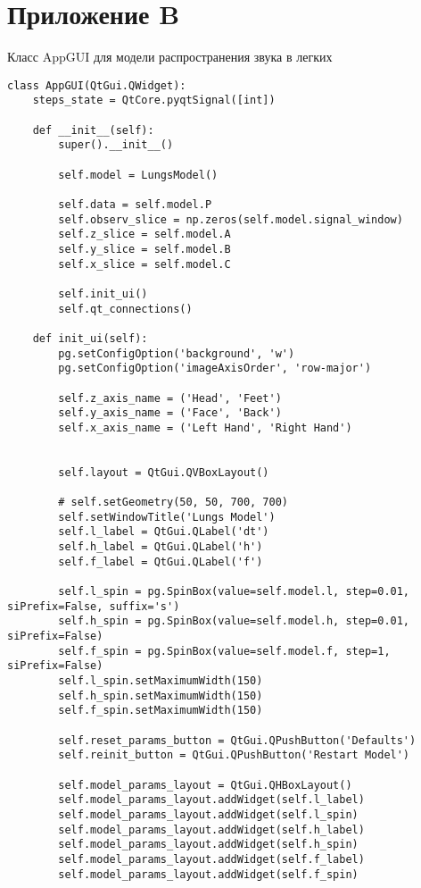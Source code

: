 \documentclass[../main.tex]{subfiles}
\begin{document}
\section*{Приложение B}
\label{appendix2}
Класс AppGUI для модели распространения звука в легких

\begin{lstlisting}
class AppGUI(QtGui.QWidget):
    steps_state = QtCore.pyqtSignal([int])

    def __init__(self):
        super().__init__()
        
        self.model = LungsModel()

        self.data = self.model.P
        self.observ_slice = np.zeros(self.model.signal_window)
        self.z_slice = self.model.A
        self.y_slice = self.model.B
        self.x_slice = self.model.C

        self.init_ui()
        self.qt_connections()

    def init_ui(self):
        pg.setConfigOption('background', 'w')
        pg.setConfigOption('imageAxisOrder', 'row-major')

        self.z_axis_name = ('Head', 'Feet')
        self.y_axis_name = ('Face', 'Back')
        self.x_axis_name = ('Left Hand', 'Right Hand')


        self.layout = QtGui.QVBoxLayout()

        # self.setGeometry(50, 50, 700, 700)
        self.setWindowTitle('Lungs Model')
        self.l_label = QtGui.QLabel('dt')
        self.h_label = QtGui.QLabel('h')
        self.f_label = QtGui.QLabel('f')

        self.l_spin = pg.SpinBox(value=self.model.l, step=0.01, siPrefix=False, suffix='s')
        self.h_spin = pg.SpinBox(value=self.model.h, step=0.01, siPrefix=False)
        self.f_spin = pg.SpinBox(value=self.model.f, step=1, siPrefix=False)
        self.l_spin.setMaximumWidth(150)
        self.h_spin.setMaximumWidth(150)
        self.f_spin.setMaximumWidth(150)

        self.reset_params_button = QtGui.QPushButton('Defaults')
        self.reinit_button = QtGui.QPushButton('Restart Model')
        
        self.model_params_layout = QtGui.QHBoxLayout()
        self.model_params_layout.addWidget(self.l_label)
        self.model_params_layout.addWidget(self.l_spin)
        self.model_params_layout.addWidget(self.h_label)
        self.model_params_layout.addWidget(self.h_spin)
        self.model_params_layout.addWidget(self.f_label)
        self.model_params_layout.addWidget(self.f_spin)


\end{lstlisting}
\end{document}
